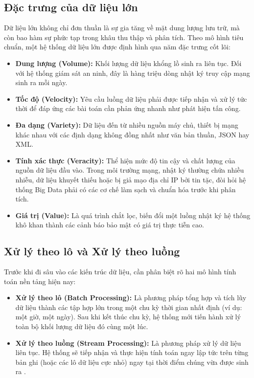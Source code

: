\documentclass[12pt,a4paper]{report}
\begin{document}
\subsection{Đặc trưng của dữ liệu lớn}
Dữ liệu lớn không chỉ đơn thuần là sự gia tăng về mặt dung lượng lưu trữ, mà còn bao hàm sự phức tạp trong khâu thu thập và phân tích. Theo mô hình tiêu chuẩn, một hệ thống dữ liệu lớn được định hình qua năm đặc trưng cốt lõi:

\begin{itemize}
    \item \textbf{Dung lượng (Volume):} Khối lượng dữ liệu khổng lồ sinh ra liên tục. Đối với hệ thống giám sát an ninh, đây là hàng triệu dòng nhật ký truy cập mạng sinh ra mỗi ngày.
    \item \textbf{Tốc độ (Velocity):} Yêu cầu luồng dữ liệu phải được tiếp nhận và xử lý tức thời để đáp ứng các bài toán cần phản ứng nhanh như phát hiện tấn công.
    \item \textbf{Đa dạng (Variety):} Dữ liệu đến từ nhiều nguồn máy chủ, thiết bị mạng khác nhau với các định dạng không đồng nhất như văn bản thuần, JSON hay XML.
    \item \textbf{Tính xác thực (Veracity):} Thể hiện mức độ tin cậy và chất lượng của nguồn dữ liệu đầu vào. Trong môi trường mạng, nhật ký thường chứa nhiều nhiễu, dữ liệu khuyết thiếu hoặc bị giả mạo địa chỉ IP bởi tin tặc, đòi hỏi hệ thống Big Data phải có các cơ chế làm sạch và chuẩn hóa trước khi phân tích.
    \item \textbf{Giá trị (Value):} Là quá trình chắt lọc, biến đổi một luồng nhật ký hệ thống khô khan thành các cảnh báo bảo mật có giá trị thực tiễn cao.
\end{itemize}

\subsection{Xử lý theo lô và Xử lý theo luồng}
Trước khi đi sâu vào các kiến trúc dữ liệu, cần phân biệt rõ hai mô hình tính toán nền tảng hiện nay:
\begin{itemize}
    \item \textbf{Xử lý theo lô (Batch Processing):} Là phương pháp tổng hợp và tích lũy dữ liệu thành các tập hợp lớn trong một chu kỳ thời gian nhất định (ví dụ: một giờ, một ngày). Sau khi kết thúc chu kỳ, hệ thống mới tiến hành xử lý toàn bộ khối lượng dữ liệu đó cùng một lúc.
    \item \textbf{Xử lý theo luồng (Stream Processing):} Là phương pháp xử lý dữ liệu liên tục. Hệ thống sẽ tiếp nhận và thực hiện tính toán ngay lập tức trên từng bản ghi (hoặc các lô dữ liệu cực nhỏ) ngay tại thời điểm chúng vừa được sinh ra \cite{kleppmann2017}.
\end{itemize}
\end{document}
